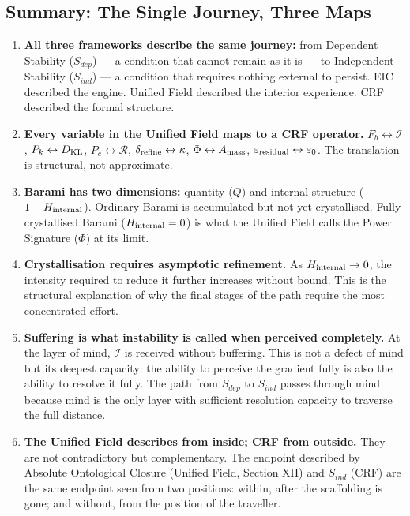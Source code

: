 \documentclass[12pt, a4paper]{article}
\begin{document}
\subsection*{Summary: The Single Journey, Three Maps}

\begin{enumerate}

\item \textbf{All three frameworks describe the same journey:}
from Dependent Stability ($S_{dep}$) --- a condition that cannot remain as it is ---
to Independent Stability ($S_{ind}$) --- a condition that requires nothing external
to persist. EIC described the engine. Unified Field described the interior experience.
CRF described the formal structure.

\item \textbf{Every variable in the Unified Field maps to a CRF operator.}
$F_b \leftrightarrow \mathcal{I}$, $P_k \leftrightarrow D_{\rm KL}$,
$P_c \leftrightarrow \mathcal{R}$, $\delta_{\rm refine} \leftrightarrow \kappa$,
$\Phi \leftrightarrow A_{\rm mass}$, $\varepsilon_{\rm residual} \leftrightarrow \varepsilon_0$.
The translation is structural, not approximate.

\item \textbf{Barami has two dimensions:} quantity ($Q$) and internal structure
($1 - H_{\rm internal}$). Ordinary Barami is accumulated but not yet crystallised.
Fully crystallised Barami ($H_{\rm internal} = 0$) is what the Unified Field
calls the Power Signature ($\Phi$) at its limit.

\item \textbf{Crystallisation requires asymptotic refinement.}
As $H_{\rm internal} \to 0$, the intensity required to reduce it further
increases without bound. This is the structural explanation of why the final
stages of the path require the most concentrated effort.

\item \textbf{Suffering is what instability is called when perceived completely.}
At the layer of mind, $\mathcal{I}$ is received without buffering. This is not
a defect of mind but its deepest capacity: the ability to perceive the gradient
fully is also the ability to resolve it fully. The path from $S_{dep}$ to
$S_{ind}$ passes through mind because mind is the only layer with sufficient
resolution capacity to traverse the full distance.

\item \textbf{The Unified Field describes from inside; CRF from outside.}
They are not contradictory but complementary. The endpoint described by
Absolute Ontological Closure (Unified Field, Section XII) and $S_{ind}$ (CRF)
are the same endpoint seen from two positions: within, after the scaffolding
is gone; and without, from the position of the traveller.


\end{enumerate}
\end{document}
